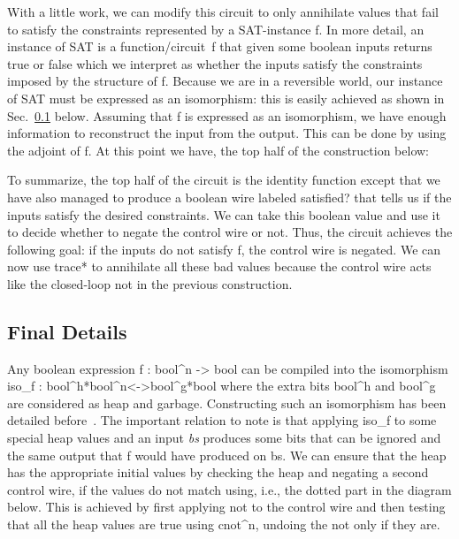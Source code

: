 \documentclass[preprint]{sigplanconf}
\begin{document}
With a little work, we can modify this circuit to only annihilate values that
fail to satisfy the constraints represented by a SAT-instance {{f}}. In more
detail, an instance of SAT is a function/circuit~{{f}} that given some
boolean inputs returns {{true}} or {{false}} which we interpret as whether
the inputs satisfy the constraints imposed by the structure of {{f}}. Because
we are in a reversible world, our instance of SAT must be expressed as an
isomorphism: this is easily achieved as shown in Sec.~\ref{sub:f}
below. Assuming that {{f}} is expressed as an isomorphism, we have enough
information to reconstruct the input from the output. This can be done by
using the adjoint of {{f}}. At this point we have, the top half of the
construction below:

\begin{center}
\end{center}  

To summarize, the top half of the circuit is the identity function except
that we have also managed to produce a boolean wire labeled
\textsf{satisfied?} that tells us if the inputs satisfy the desired
constraints. We can take this boolean value and use it to decide whether to
negate the control wire or not. Thus, the circuit achieves the following
goal: if the inputs do not satisfy {{f}}, the control wire is negated.  We
can now use {{trace*}} to annihilate all these bad values because the control
wire acts like the closed-loop {{not}} in the previous construction.

\subsection{Final Details}
\label{sub:f}

Any boolean expression {{f : bool^n -> bool}} can be compiled into the
isomorphism {{iso_f : bool^h*bool^n<->bool^g*bool}} where the extra
bits {{bool^h}} and {{bool^g}} are considered as heap and
garbage. Constructing such an isomorphism has been detailed
before~\cite{Toffoli:1980,infeffects}. The important relation to note
is that applying {{iso_f}} to some special heap values and an input
\textit{bs} produces some bits that can be ignored and the same output
that {{f}} would have produced on {{bs}}. We can ensure that the heap
has the appropriate initial values by checking the heap and negating a
second control wire, if the values do not match using, i.e., the
dotted part in the diagram below. This is achieved by first applying
{{not}} to the control wire and then testing that all the heap values
are true using {{cnot^n}}, undoing the {{not}} only if they are.
\end{document}
